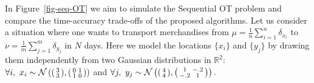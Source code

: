 In Figure~\ref{fig-seq-OT} we aim to simulate the Sequential OT problem and compare the time-accuracy trade-offs of the proposed algorithms. Let us consider a situation where one wants to transport merchandises from $\mu = \frac{1}{n}\sum_{i=1}^n  \delta_{x_i}$ to $\nu =\frac{1}{m} \sum_{j=1}^m \delta_{y_j}$ in $N$ days. Here we model the locations  $\{x_i\}$ and $\{y_j\}$ by drawing them independently from two Gaussian distributions in $\mathbb{R}^2$: $\forall i,~x_i\sim \mathcal{N}\left(\begin{psmallmatrix}
3\\
3\\
\end{psmallmatrix},\begin{psmallmatrix}
0 & 1\\
1 & 0 \\
\end{psmallmatrix}\right)$ and $\forall j,~y_j\sim \mathcal{N}\left(\begin{psmallmatrix}
4\\
4\\
\end{psmallmatrix},\begin{psmallmatrix}
1 & -.2\\
-.2 & 1\\
\end{psmallmatrix}\right).$

